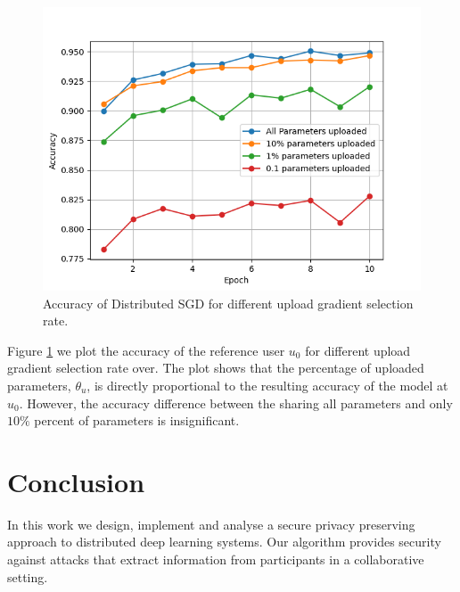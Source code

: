 \documentclass[conference]{IEEEtran}
\begin{document}

\begin{figure}[!h]
\centering
\includegraphics[width=\columnwidth, keepaspectratio]{VaryingThetaUGrid}
\caption{Accuracy of Distributed SGD for different upload gradient selection rate. }
\label{fig:VaryingThetaU}
\end{figure}

Figure \ref{fig:VaryingThetaU} we plot the accuracy of the reference user $u_0$ for different upload gradient selection rate over. 
The plot shows that the percentage of uploaded parameters, $\theta_u$, is directly proportional to the resulting accuracy of
the model at $u_0$. However, the accuracy difference between the sharing all parameters and only $ 10\% $ percent of parameters is
insignificant.



\section{Conclusion}

In this work we design, implement and analyse a secure privacy preserving approach to distributed deep learning systems.  Our
algorithm provides security against attacks that extract information from participants in a collaborative setting. 
\end{document}
